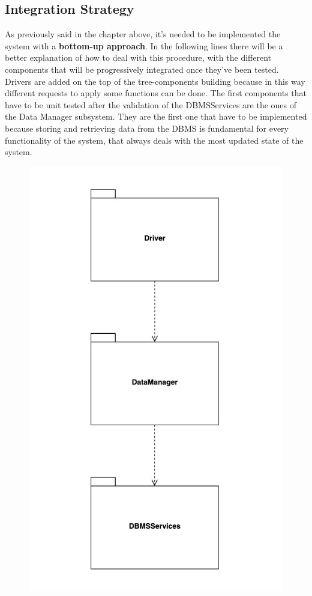 \documentclass[]{article}
\begin{document}
				\subsection{Integration Strategy}
				\medskip
As previously said in the chapter above, it’s needed to be implemented the system with a \textbf{bottom-up approach}. In the following lines there will be a better explanation of how to deal with this procedure, with the different components that will be progressively integrated once they’ve been tested. Drivers are added on the top of the tree-components building because in this way different requests to apply some functions can be done.
\noindent
The first components that have to be unit tested after the validation of the DBMSServices are the ones of the Data Manager subsystem. They are the first one that have to be implemented because storing and retrieving data from the DBMS is fundamental for every functionality of the system, that always deals with the most updated state of the system. 
				\begin{figure}[H]
					\centering
					\includegraphics[scale=0.7]{Testing/Testing1.png}
					\caption{}
					\label{fig:Testing}
				\end{figure}
\end{document}
